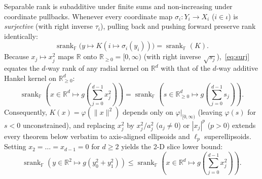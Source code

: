 \documentclass[11pt,a4paper]{article}
\theoremstyle{plain}
\theoremstyle{definition}
\newcommand{\R}{\mathbb{R}}
\newcommand{\Field}{\mathbb{F}}
\newcommand{\Rnn}{\mathbb{R}_{\ge 0}}
\DeclareMathOperator{\srank}{srank}
\begin{document}
Separable rank is subadditive under finite sums and non-increasing under coordinate pullbacks. Whenever every coordinate map $\sigma_i : Y_i \to X_i$ ($i \in \iota$) is \emph{surjective} (with right inverse $\tau_i$), pulling back and pushing forward preserve rank identically:
\begin{equation}\label{eq:surj}
  \srank_{\Field}\!\bigl(y \mapsto K(i \mapsto \sigma_i(y_i))\bigr) = \srank_{\Field}(K).
\end{equation}
Because $x_j \mapsto x_j^2$ maps $\R$ onto $\Rnn = [0,\infty)$ (with right inverse $\sqrt{s_j}$),~\eqref{eq:surj} equates the $d$-way rank of any radial kernel on $\R^d$ with that of the $d$-way additive Hankel kernel on $\Rnn^d$:
\begin{equation}\label{eq:hankel}
  \srank_{\Field}\!\left(x \in \R^d \mapsto g\!\left(\sum_{j=0}^{d-1} x_j^2\right)\right)
  = \srank_{\Field}\!\left(s \in \Rnn^d \mapsto g\!\left(\sum_{j=0}^{d-1} s_j\right)\right).
\end{equation}
Consequently, $K(x) = \varphi(\|x\|^2)$ depends only on $\varphi|_{[0,\infty)}$ (leaving $\varphi(s)$ for $s < 0$ unconstrained), and replacing $x_j^2$ by $x_j^2/a_j^2$ ($a_j \ne 0$) or $|x_j|^p$ ($p > 0$) extends every theorem below verbatim to axis-aligned ellipsoids and $\ell_p$ superellipsoids. Setting $x_2 = \dots = x_{d-1} = 0$ for $d \ge 2$ yields the 2-D slice lower bound:
\begin{equation}\label{eq:slice}
  \srank_{\Field}\!\left(y \in \R^2 \mapsto g(y_0^2 + y_1^2)\right)
  \le \srank_{\Field}\!\left(x \in \R^d \mapsto g\!\left(\sum_{j=0}^{d-1} x_j^2\right)\right).
\end{equation}
\end{document}
